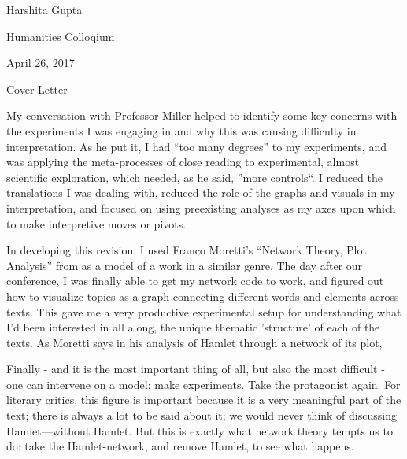 \documentclass[12pt]{article}
\newenvironment{coverletter}{\begin{center} Cover Letter \end{center}}{\newpage }
\begin{document}
\begin{flushleft}


\begin{spacing}{2.0}
Harshita Gupta

Humanities Colloqium

April 26, 2017

\begin{coverletter}
\singlespacing

My conversation with Professor Miller helped to identify some key concerns with the experiments I was engaging in and why this was causing difficulty in interpretation. As he put it, I had ``too many degrees'' to my experiments, and was applying the meta-processes of close reading to experimental, almost scientific exploration, which needed, as he said, ''more controls``. I reduced the translations I was dealing with, reduced the role of the graphs and visuals in my interpretation, and focused on using preexisting analyses as my axes upon which to make interpretive moves or pivots. 

In developing this revision, I used Franco Moretti's ``Network Theory, Plot Analysis'' from  as a model of a work in a similar genre. The day after our conference, I was finally able to get my network code to work, and figured out how to visualize topics as a graph connecting different words and elements across texts. This gave me a very productive experimental setup for understanding what I'd been interested in all along, the unique thematic 'structure' of each of the texts. As Moretti says in his analysis of Hamlet through a network of its plot,

\begin{displayquote}
Finally - and it is the most important thing of all, but also the most difficult - one can intervene on a model; make experiments. Take the protagonist again. For literary critics, this figure is important because it is a very meaningful part of the text; there is always a lot to be said about it; we would never think of discussing Hamlet—without Hamlet. But this is exactly what network theory tempts us to do: take the Hamlet-network, and remove Hamlet, to see what happens.
\end{displayquote}


\end{coverletter}
\end{spacing}
\end{flushleft}
\end{document}
